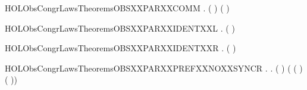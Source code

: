 \begin{SaveVerbatim}{HOLObsCongrLawsTheoremsOBSXXPARXXCOMM}
\HOLTokenTurnstile{} \HOLSymConst{\HOLTokenForall{}} .  ( \HOLSymConst{\ensuremath{\parallel}} ) ( \HOLSymConst{\ensuremath{\parallel}} )
\end{SaveVerbatim}
\newcommand{\HOLObsCongrLawsTheoremsOBSXXPARXXCOMM}{\UseVerbatim{HOLObsCongrLawsTheoremsOBSXXPARXXCOMM}}
\begin{SaveVerbatim}{HOLObsCongrLawsTheoremsOBSXXPARXXIDENTXXL}
\HOLTokenTurnstile{} \HOLSymConst{\HOLTokenForall{}}.  ( \HOLSymConst{\ensuremath{\parallel}} ) 
\end{SaveVerbatim}
\newcommand{\HOLObsCongrLawsTheoremsOBSXXPARXXIDENTXXL}{\UseVerbatim{HOLObsCongrLawsTheoremsOBSXXPARXXIDENTXXL}}
\begin{SaveVerbatim}{HOLObsCongrLawsTheoremsOBSXXPARXXIDENTXXR}
\HOLTokenTurnstile{} \HOLSymConst{\HOLTokenForall{}}.  ( \HOLSymConst{\ensuremath{\parallel}} ) 
\end{SaveVerbatim}
\newcommand{\HOLObsCongrLawsTheoremsOBSXXPARXXIDENTXXR}{\UseVerbatim{HOLObsCongrLawsTheoremsOBSXXPARXXIDENTXXR}}
\begin{SaveVerbatim}{HOLObsCongrLawsTheoremsOBSXXPARXXPREFXXNOXXSYNCR}
\HOLTokenTurnstile{} \HOLSymConst{\HOLTokenForall{}} .
        \HOLSymConst{\HOLTokenNotEqual{}}   \HOLSymConst{\HOLTokenImp{}}
       \HOLSymConst{\HOLTokenForall{}} .
            (  \HOLSymConst{\ensuremath{\parallel}}  )
             ( ( \HOLSymConst{\ensuremath{\parallel}}  ) \HOLSymConst{\ensuremath{+}}
               (  \HOLSymConst{\ensuremath{\parallel}} ))
\end{SaveVerbatim}
\newcommand{\HOLObsCongrLawsTheoremsOBSXXPARXXPREFXXNOXXSYNCR}{\UseVerbatim{HOLObsCongrLawsTheoremsOBSXXPARXXPREFXXNOXXSYNCR}}

